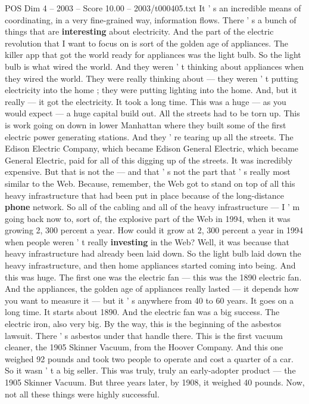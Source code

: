 \begin{textsample}{POS Dim 4 – 2003 – Score 10.00 – 2003/t000405.txt}
It ' s an incredible means of coordinating, in a very fine-grained way, information flows.
There ' s a bunch of things that are \textbf{interesting} about electricity.
And the part of the electric revolution that I want to focus on is sort of the golden age of appliances.
The killer app that got the world ready for appliances was the light bulb.
So the light bulb is what wired the world.
And they weren ' t thinking about appliances when they wired the world.
They were really thinking about — they weren ' t putting electricity into the home ; they were putting lighting into the home.
And, but it really — it got the electricity.
It took a long time.
This was a huge — as you would expect — a huge capital build out.
All the streets had to be torn up.
This is work going on down in lower Manhattan where they built some of the first electric power generating stations.
And they ' re tearing up all the streets.
The Edison Electric Company, which became Edison General Electric, which became General Electric, paid for all of this digging up of the streets.
It was incredibly expensive.
But that is not the — and that ' s not the part that ' s really most similar to the Web.
Because, remember, the Web got to stand on top of all this heavy infrastructure that had been put in place because of the long-distance \textbf{phone} network.
So all of the cabling and all of the heavy infrastructure — I ' m going back now to, sort of, the explosive part of the Web in 1994, when it was growing 2, 300 percent a year.
How could it grow at 2, 300 percent a year in 1994 when people weren ' t really \textbf{investing} in the Web?
Well, it was because that heavy infrastructure had already been laid down.
So the light bulb laid down the heavy infrastructure, and then home appliances started coming into being.
And this was huge.
The first one was the electric fan — this was the 1890 electric fan.
And the appliances, the golden age of appliances really lasted — it depends how you want to measure it — but it ' s anywhere from 40 to 60 years.
It goes on a long time.
It starts about 1890.
And the electric fan was a big success.
The electric iron, also very big.
By the way, this is the beginning of the asbestos lawsuit.
There ' s asbestos under that handle there.
This is the first vacuum cleaner, the 1905 Skinner Vacuum, from the Hoover Company.
And this one weighed 92 pounds and took two people to operate and cost a quarter of a car.
So it wasn ' t a big seller.
This was truly, truly an early-adopter product — the 1905 Skinner Vacuum.
But three years later, by 1908, it weighed 40 pounds.
Now, not all these things were highly successful.

\end{textsample}
